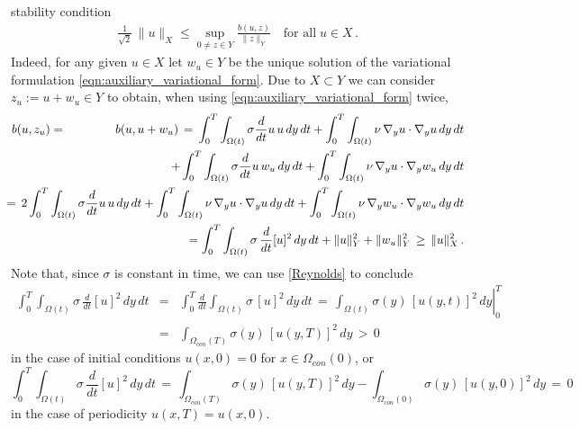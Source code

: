 \documentclass[12pt]{article}
\numberwithin{equation}{section}
\begin{document}
stability condition
\begin{align}\label{inf-sup}
  \frac{1}{\sqrt{2}} \, \|u\|_X \leq
  \sup\limits_{0 \neq z \in Y} \frac{b(u,z)}{\|z\|_Y} \quad \mbox{for all} \;
  u \in X \, .
\end{align}
Indeed, for any given $u \in X$ let $w_u \in Y$ be the unique solution
of the variational formulation \eqref{eqn:auxiliary_variational_form}.
Due to $X \subset Y$ we can consider $z_u := u + w_u \in Y$ to obtain,
when using \eqref{eqn:auxiliary_variational_form} twice,
\begin{eqnarray*}
  b(u,z_u)
  & = & b(u,u+w_u) \, = \,
        \int_0^T \int_{\Omega(t)} \sigma \frac{d}{dt}u \, u \, dy \, dt +
        \int_0^T \int_{\Omega(t)} \nu \, \nabla_y u \cdot \nabla_y u \, dy \, dt
  \\
  & & \hspace*{25mm}
      + \int_0^T \int_{\Omega(t)} \sigma \frac{d}{dt}u \, w_u \, dy \, dt +
      \int_0^T \int_{\Omega(t)} \nu \, \nabla_y u \cdot \nabla_y w_u \, dy \, dt
  \\
  & & \hspace*{-2cm}
      = \, 2 \int_0^T \int_{\Omega(t)} \sigma \frac{d}{dt}u \, u \, dy \, dt
        +
        \int_0^T \int_{\Omega(t)} \nu \, \nabla_y u \cdot \nabla_y u \, dy \, dt
        +
        \int_0^T \int_{\Omega(t)} \nu \, \nabla_y w_u
        \cdot \nabla_y w_u \, dy \, dt \\
  && \hspace*{-2cm}
     = \int_0^T \int_{\Omega(t)} \sigma \, \frac{d}{dt} [u]^2 \, dy \, dt +
        \| u \|_Y^2 + \| w_u \|^2_Y \, \geq \, \| u \|_X^2 \, .
\end{eqnarray*}
Note that, since $\sigma$ is constant in time,
we can use \eqref{Reynolds} to conclude
\begin{eqnarray*}
  \int_0^T \int_{\Omega(t)} \sigma \, \frac{d}{dt} [u]^2 \, dy \, dt
  & = & \int_0^T \frac{d}{dt} \int_{\Omega(t)} \sigma \, [u]^2 \, dy \, dt
        \, = \, \left.
        \int_{\Omega(t)} \sigma(y) \, [u(y,t)]^2 \, dy \right|_0^T \\
  & = &  \int_{\Omega_{con}(T)} \sigma(y) \, [u(y,T)]^2 \, dy \, > \, 0
\end{eqnarray*}
in the case of initial conditions $u(x,0)=0$ for $x \in \Omega_{con}(0)$, or
\[
  \int_0^T \int_{\Omega(t)} \sigma \, \frac{d}{dt} [u]^2 \, dy \, dt \, = \,
  \int_{\Omega_{con}(T)} \sigma(y) \, [u(y,T)]^2 \, dy -
  \int_{\Omega_{con}(0)} \sigma(y) \, [u(y,0)]^2 \, dy \, = \, 0 
\]
in the case of periodicity $u(x,T)=u(x,0)$.
\end{document}
